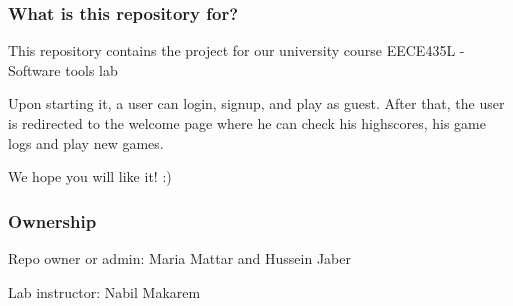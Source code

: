 \subsubsection*{What is this repository for?}

This repository contains the project for our university course E\-E\-C\-E435\-L -\/ Software tools lab

Upon starting it, a user can login, signup, and play as guest. After that, the user is redirected to the welcome page where he can check his highscores, his game logs and play new games.

We hope you will like it! \-:)

\subsubsection*{Ownership}


\begin{DoxyItemize}
\item Repo owner or admin\-: Maria Mattar and Hussein Jaber
\item Lab instructor\-: Nabil Makarem 
\end{DoxyItemize}